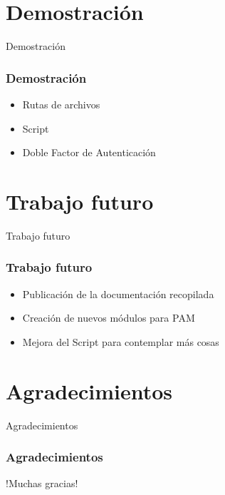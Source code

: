 \documentclass{beamer}
\begin{document}
\section{Demostración}
\begin{frame}{Demostración}
	\frametitle{Demostración}
	\begin{itemize}
		\item Rutas de archivos
		\vspace{0.7cm}
		\item Script
		\vspace{0.7cm}
		\item Doble Factor de Autenticación
	\end{itemize}
\end{frame}
\section{Trabajo futuro}
\begin{frame}{Trabajo futuro}
	\frametitle{Trabajo futuro}
	\begin{itemize}
		\item Publicación de la documentación recopilada
		\vspace{0.7cm}
		\item Creación de nuevos módulos para PAM
		\vspace{0.7cm}
		\item Mejora del Script para contemplar más cosas
	\end{itemize}
\end{frame}
\section{Agradecimientos}
\begin{frame}{Agradecimientos}
	\frametitle{Agradecimientos}
	\begin{center}
	\huge !Muchas gracias!
	\end{center}
\end{frame}
\end{document}
